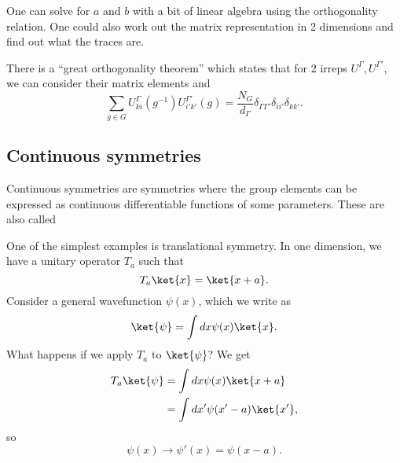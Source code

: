 One can solve for $a$ and $b$ with a bit of linear algebra using the orthogonality relation. One could also work out the matrix representation in 2 dimensions and find out what the traces are.

There is a ``great orthogonality theorem'' which states that for 2 irreps $U^\Gamma, U^{\Gamma'}$, we can consider their matrix elements and
\begin{equation}
    \sum_{g\in G} U_{ki}^\Gamma(g^{-1}) U_{i'k'}^{\Gamma'} (g) = \frac{N_G}{d_\Gamma} \delta_{\Gamma\Gamma'} \delta_{ii'} \delta_{kk'}.
\end{equation}

\subsection*{Continuous symmetries}
Continuous symmetries are symmetries where the group elements can be expressed as continuous differentiable functions of some parameters. These are also called 

One of the simplest examples is translational symmetry. In one dimension, we have a unitary operator $T_a$ such that
\begin{equation}
    T_a \ket{x} = \ket{x+a}.
\end{equation}
Consider a general wavefunction $\psi(x)$, which we write as
\begin{equation}
    \ket{\psi} = \int dx \psi(x) \ket{x}.
\end{equation}
What happens if we apply $T_a$ to $\ket{\psi}$? We get
\begin{align}
    T_a \ket{\psi} &= \int dx \psi(x) \ket{x+a}\\
        &= \int dx' \psi(x'-a) \ket{x'},
\end{align}
so
\begin{equation}
    \psi(x) \to \psi'(x) = \psi(x-a).
\end{equation}

